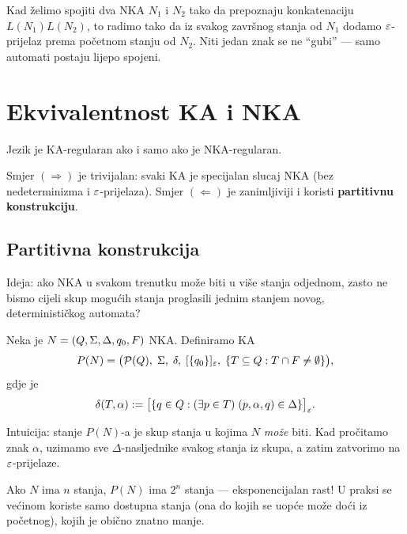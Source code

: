 \begin{primjer}
Kad želimo spojiti dva NKA $N_1$ i $N_2$ tako da prepoznaju
konkatenaciju $L(N_1) L(N_2)$, to radimo tako da iz svakog završnog
stanja od $N_1$ dodamo $\varepsilon$-prijelaz prema početnom stanju od $N_2$.
Niti jedan znak se ne ``gubi'' --- samo automati postaju lijepo spojeni.
\end{primjer}

\section{Ekvivalentnost KA i NKA}

\begin{propozicija}
Jezik je KA-regularan ako i samo ako je NKA-regularan.
\end{propozicija}

Smjer $(\Rightarrow)$ je trivijalan: svaki KA je specijalan slucaj NKA
(bez nedeterminizma i $\varepsilon$-prijelaza). Smjer $(\Leftarrow)$ je
zanimljiviji i koristi \textbf{partitivnu konstrukciju}.

\subsection{Partitivna konstrukcija}

Ideja: ako NKA u svakom trenutku može biti u više stanja odjednom,
zasto ne bismo cijeli skup mogućih stanja proglasili jednim stanjem
novog, determinističkog automata?

\begin{definicija}
Neka je $N = (Q, \Sigma, \Delta, q_0, F)$ NKA. Definiramo KA
\[
  P(N) = \bigl(\mathcal{P}(Q),\; \Sigma,\; \delta,\; [\{q_0\}]_\varepsilon,\;
  \{T \subseteq Q : T \cap F \neq \emptyset\}\bigr),
\]
gdje je
\[
  \delta(T, \alpha) := \bigl[\{q \in Q : (\exists p \in T)\; (p, \alpha, q) \in \Delta\}\bigr]_\varepsilon.
\]
\end{definicija}

Intuicija: stanje $P(N)$-a je skup stanja u kojima $N$ \emph{može}
biti. Kad pročitamo znak $\alpha$, uzimamo sve $\Delta$-nasljednike
svakog stanja iz skupa, a zatim zatvorimo na $\varepsilon$-prijelaze.

\begin{napomena}
Ako $N$ ima $n$ stanja, $P(N)$ ima $2^n$ stanja --- eksponencijalan
rast! U praksi se većinom koriste samo dostupna stanja (ona do kojih
se uopće može doći iz početnog), kojih je obično znatno manje.
\end{napomena}

